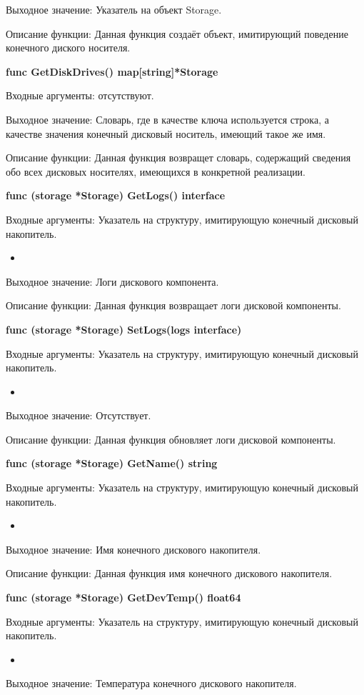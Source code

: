 Выходное значение: Указатель на объект Storage. 

Описание функции: Данная функция создаёт объект, имитирующий поведение конечного диского носителя.

\textbf{func GetDiskDrives() map[string]*Storage}

Входные аргументы: отсутствуют.

Выходное значение: Словарь, где в качестве ключа используется строка, а качестве значения конечный дисковый носитель, имеющий такое же имя.

Описание функции: Данная функция возвращет словарь, содержащий сведения обо всех дисковых носителях, имеющихся в конкретной реализации. 

\textbf{func (storage *Storage) GetLogs() interface{}}

Входные аргументы: Указатель на структуру, имитирующую конечный дисковый накопитель.
\begin{itemize}
	\item 
\end{itemize}

Выходное значение: Логи дискового компонента. 

Описание функции: Данная функция возвращает логи дисковой компоненты. 

\textbf{func (storage *Storage) SetLogs(logs interface{})}

Входные аргументы: Указатель на структуру, имитирующую конечный дисковый накопитель.
\begin{itemize}
	\item 
\end{itemize}

Выходное значение:  Отсутствует.

Описание функции: Данная функция обновляет логи дисковой компоненты. 

\textbf{func (storage *Storage) GetName() string}

Входные аргументы: Указатель на структуру, имитирующую конечный дисковый накопитель.
\begin{itemize}
	\item 
\end{itemize}

Выходное значение: Имя конечного дискового накопителя.

Описание функции: Данная функция имя конечного дискового накопителя.

\textbf{func (storage *Storage) GetDevTemp() float64}

Входные аргументы: Указатель на структуру, имитирующую конечный дисковый накопитель.
\begin{itemize}
	\item 
\end{itemize}
Выходное значение: Температура конечного дискового накопителя.

